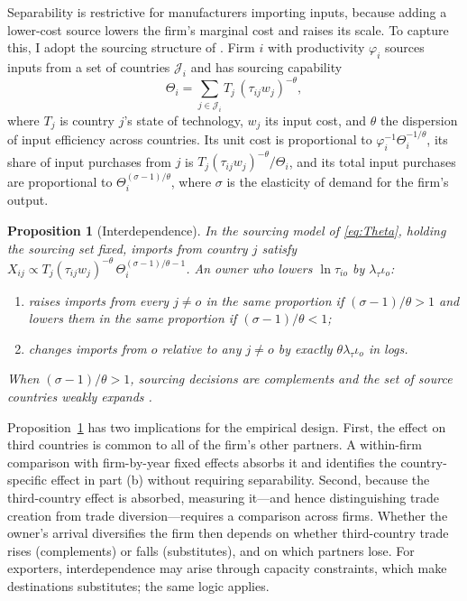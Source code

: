 \documentclass[12pt]{article}
\newtheorem{proposition}{Proposition}
\theoremstyle{remark}
\begin{document}
Separability is restrictive for manufacturers importing inputs, because adding
a lower-cost source lowers the firm's marginal cost and raises its scale. To
capture this, I adopt the sourcing structure of \citet{antras2017}. Firm $i$
with productivity $\varphi_i$ sources inputs from a set of countries
$\mathcal{J}_i$ and has sourcing capability
\begin{equation}
\Theta_i=\sum_{j\in\mathcal{J}_i}T_j\,(\tau_{ij}w_j)^{-\theta},
\label{eq:Theta}
\end{equation}
where $T_j$ is country $j$'s state of technology, $w_j$ its input cost, and
$\theta$ the dispersion of input efficiency across countries. Its unit cost is
proportional to $\varphi_i^{-1}\Theta_i^{-1/\theta}$, its share of input
purchases from $j$ is $T_j(\tau_{ij}w_j)^{-\theta}/\Theta_i$, and its total
input purchases are proportional to $\Theta_i^{(\sigma-1)/\theta}$, where
$\sigma$ is the elasticity of demand for the firm's output.

\begin{proposition}[Interdependence]\label{prop:interdep}
In the sourcing model of \eqref{eq:Theta}, holding the sourcing set fixed,
imports from country $j$ satisfy
$X_{ij}\propto T_j(\tau_{ij}w_j)^{-\theta}\,\Theta_i^{(\sigma-1)/\theta-1}$.
An owner who lowers $\ln\tau_{io}$ by $\lambda_\tau\iota_o$:
\begin{enumerate}[label=(\alph*),itemsep=0.1em]
\item raises imports from every $j\neq o$ in the same proportion if
$(\sigma-1)/\theta>1$ and lowers them in the same proportion if
$(\sigma-1)/\theta<1$;
\item changes imports from $o$ relative to any $j\neq o$ by exactly
$\theta\lambda_\tau\iota_o$ in logs.
\end{enumerate}
When $(\sigma-1)/\theta>1$, sourcing decisions are complements and the set of
source countries weakly expands \citep{antras2017}.
\end{proposition}

\noindent Proposition~\ref{prop:interdep} has two implications for the
empirical design. First, the effect on third countries is common to all of
the firm's other partners. A within-firm comparison with firm-by-year fixed
effects absorbs it and identifies the country-specific effect in part (b)
without requiring separability. Second, because the third-country effect is
absorbed, measuring it---and hence distinguishing trade creation from trade
diversion---requires a comparison across firms. Whether the owner's
arrival diversifies the firm then depends on whether third-country trade
rises (complements) or falls (substitutes), and on which partners lose.
For exporters, interdependence may arise through capacity constraints, which
make destinations substitutes; the same logic applies.
\end{document}

